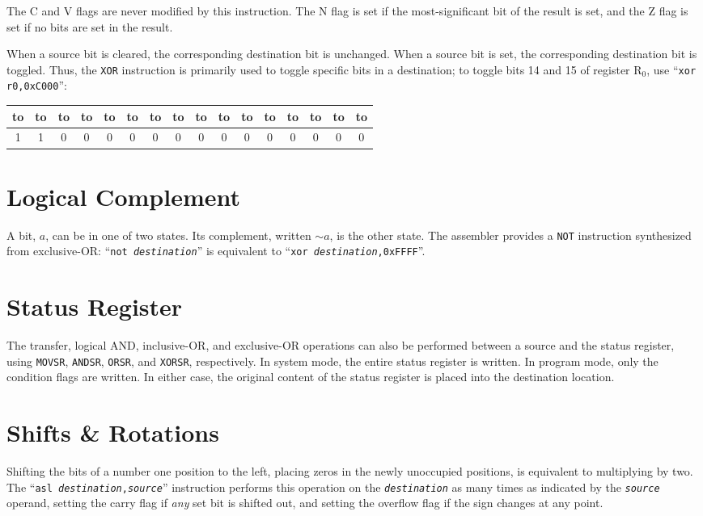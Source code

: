 \documentclass[12pt,english]{book}
\newcommand*{\encoding}[1]{\noindent
\begin{tabular}{|c|c|c|c|c|c|c|c|c|c|c|c|c|c|c|c|}
\multicolumn{1}{c}{\hbox to \wd\boxa{\hss 15\hss}}&
\multicolumn{1}{c}{\hbox to \wd\boxa{\hss 14\hss}}&
\multicolumn{1}{c}{\hbox to \wd\boxa{\hss 13\hss}}&
\multicolumn{1}{c}{\hbox to \wd\boxa{\hss 12\hss}}&
\multicolumn{1}{c}{\hbox to \wd\boxa{\hss 11\hss}}&
\multicolumn{1}{c}{\hbox to \wd\boxa{\hss 10\hss}}&
\multicolumn{1}{c}{\hbox to \wd\boxa{\hss 9\hss}}&
\multicolumn{1}{c}{\hbox to \wd\boxa{\hss 8\hss}}&
\multicolumn{1}{c}{\hbox to \wd\boxa{\hss 7\hss}}&
\multicolumn{1}{c}{\hbox to \wd\boxa{\hss 6\hss}}&
\multicolumn{1}{c}{\hbox to \wd\boxa{\hss 5\hss}}&
\multicolumn{1}{c}{\hbox to \wd\boxa{\hss 4\hss}}&
\multicolumn{1}{c}{\hbox to \wd\boxa{\hss 3\hss}}&
\multicolumn{1}{c}{\hbox to \wd\boxa{\hss 2\hss}}&
\multicolumn{1}{c}{\hbox to \wd\boxa{\hss 1\hss}}&
\multicolumn{1}{c}{\hbox to \wd\boxa{\hss 0\hss}}\\\hline
#1\\\hline
\end{tabular}}
\begin{document}
The C and V flags are never modified by this instruction.
The N flag is set if the most-significant bit of the result is set,
and the Z flag is set if no bits are set in the result.

When a source bit is cleared,
the corresponding destination bit is unchanged.
When a source bit is set,
the corresponding destination bit is toggled.
Thus, the \texttt{XOR} instruction is primarily used
to toggle specific bits in a destination;
to toggle bits 14 and 15 of register \(\text{R}_0\),
use ``\texttt{xor r0,0xC000}'':
\begin{center}
\encoding{1&1&0&0&0&0&0&0&0&0&0&0&0&0&0&0}
\end{center}

\section{Logical Complement}
A bit, \(a\), can be in one of two states.
Its complement, written \({\sim}a\), is the other state.
The assembler provides a \texttt{NOT} instruction
synthesized from exclusive-OR:
``\texttt{not \textit{destination}}''
is equivalent to ``\texttt{xor \textit{destination},0xFFFF}''.

\section{Status Register}
The transfer, logical AND, inclusive-OR, and exclusive-OR operations
can also be performed between a source and the status register,
using \texttt{MOVSR}, \texttt{ANDSR}, \texttt{ORSR},
and \texttt{XORSR}, respectively.
In system mode, the entire status register is written.
In program mode, only the condition flags are written.
In either case, the original content of the status register
is placed into the destination location.

\section{Shifts \& Rotations}
Shifting the bits of a number one position to the left,
placing zeros in the newly unoccupied positions,
is equivalent to multiplying by two.
The ``\texttt{asl \textit{destination},\textit{source}}''
instruction performs this operation
on the \texttt{\textit{destination}} as many times
as indicated by the \texttt{\textit{source}} operand,
setting the carry flag if \emph{any} set bit is shifted out,
and setting the overflow flag if the sign changes at any point.
\end{document}

